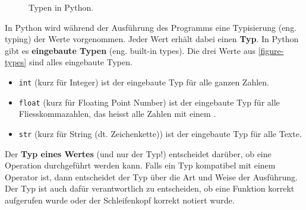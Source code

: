 \begin{figure}[htb]
\begin{minipage}{0.45\textwidth}
{
}
\caption{Typen in Python.}
\label{figure-types}
\end{minipage}
\end{figure}

In Python wird während der Ausführung des Programms eine Typisierung (eng. typing) der Werte vorgenommen. Jeder Wert erhält dabei einen \textbf{Typ}. In Python gibt es \textbf{eingebaute Typen} (eng. built-in types). Die drei Werte aus \autoref{figure-types} sind alles eingebaute Typen.

\begin{itemize}
\item \lstinline{int} (kurz für Integer) ist der eingebaute Typ für alle ganzen Zahlen.
\item \lstinline{float} (kurz für Floating Point Number) ist der eingebaute Typ für alle Fliesskommazahlen, das heisst alle Zahlen mit einem .
\item \lstinline{str} (kurz für String (dt. Zeichenkette)) ist der eingebaute Typ für alle Texte.
\end{itemize}

\begin{important}
Der \textbf{Typ eines Wertes} (und nur der Typ!) entscheidet darüber, ob eine Operation durchgeführt werden kann. Falls ein Typ kompatibel mit einem Operator ist, dann entscheidet der Typ über die Art und Weise der Ausführung. Der Typ ist auch dafür verantwortlich zu entscheiden, ob eine Funktion korrekt aufgerufen wurde oder der Schleifenkopf korrekt notiert wurde.
\end{important}

